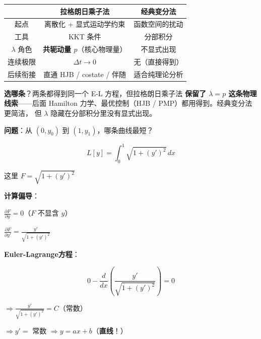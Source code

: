 \documentclass[12pt, a4paper]{ctexart}
\begin{document}
\begin{blackboard}[两种推导方法对比]
\begin{center}
\begin{tabular}{c|c|c}
\toprule
 & \textbf{拉格朗日乘子法} & \textbf{经典变分法} \\
\midrule
起点 & 离散化 + 显式运动学约束 & 函数空间的扰动 \\
工具 & KKT 条件 & 分部积分 \\
$\lambda$ 角色 & \textbf{共轭动量 $p$}（核心物理量） & 不显式出现 \\
连续极限 & $\Delta t \to 0$ & 无（直接得到） \\
后续衔接 & 直通 HJB / costate / 伴随 & 适合纯理论分析 \\
\bottomrule
\end{tabular}
\end{center}

\textbf{选哪条}？两条都得到同一个 E-L 方程，但拉格朗日乘子法
\textbf{保留了 $\lambda = p$ 这条物理线索}——后面 Hamilton 力学、最优控制（HJB / PMP）都用得到。经典变分法更简洁，
但 $\lambda$ 隐藏在分部积分里没有显式出现。

\end{blackboard}


\begin{blackboard}[例1：最短路径]

\textbf{问题}：从 $(0, y_0)$ 到 $(1, y_1)$，哪条曲线最短？

\[
L[y] = \int_0^1 \sqrt{1 + (y')^2} \, dx
\]

这里 $F = \sqrt{1 + (y')^2}$

\textbf{计算偏导}：

$\frac{\partial F}{\partial y} = 0$（$F$ 不显含 $y$）

$\frac{\partial F}{\partial y'} = \frac{y'}{\sqrt{1 + (y')^2}}$

\textbf{Euler-Lagrange方程}：

\[
0 - \frac{d}{dx}\left( \frac{y'}{\sqrt{1 + (y')^2}} \right) = 0
\]

$\Rightarrow \frac{y'}{\sqrt{1 + (y')^2}} = C$（常数）

$\Rightarrow y' = $ 常数 $\Rightarrow y = ax + b$（\textbf{直线}！）

\end{blackboard}
\end{document}
